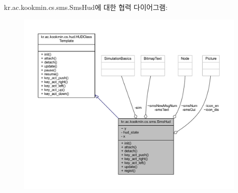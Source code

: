 kr.\+ac.\+kookmin.\+cs.\+sms.\+Sms\+Hud에 대한 협력 다이어그램\+:\nopagebreak
\begin{figure}[H]
\begin{center}
\leavevmode
\includegraphics[width=350pt]{classkr_1_1ac_1_1kookmin_1_1cs_1_1sms_1_1_sms_hud__coll__graph}
\end{center}
\end{figure}
